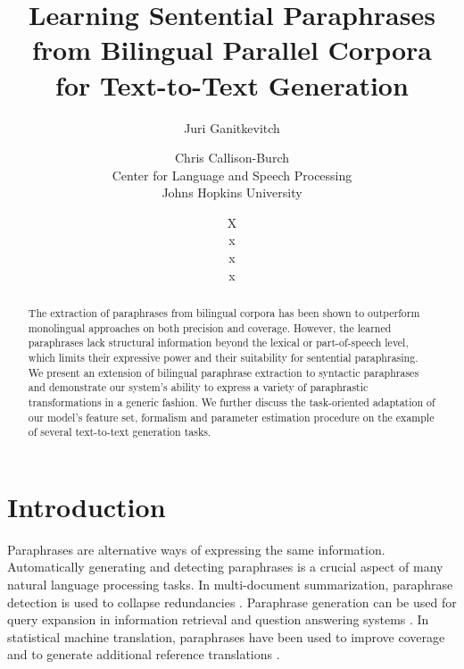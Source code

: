 \documentclass[11pt]{article}
\title{Learning Sentential Paraphrases from Bilingual Parallel Corpora \\ for Text-to-Text Generation}
\author{Juri Ganitkevitch \and Chris Callison-Burch\\ 
Center for Language and Speech Processing\\ 
Johns Hopkins University}
\author{X\\ 
x\\ 
x\\ 
x}
\date{}
\begin{document}
\maketitle

\begin{abstract}
  The extraction of paraphrases from bilingual corpora has been shown
  to outperform monolingual approaches on both precision and
  coverage. However, the learned paraphrases lack structural
  information beyond the lexical or part-of-speech level, which limits
  their expressive power and their suitability for sentential
  paraphrasing. We present an extension of bilingual paraphrase
  extraction to syntactic paraphrases and demonstrate our system's
  ability to express a variety of paraphrastic transformations in a
  generic fashion. We further discuss the task-oriented adaptation of
  our model's feature set, formalism and parameter estimation
  procedure on the example of several text-to-text generation tasks.
\end{abstract}

\section{Introduction} \label{introduction}

Paraphrases are alternative ways of expressing the same information. 
Automatically generating and detecting paraphrases is a crucial aspect of many 
natural language processing tasks.
In multi-document summarization, paraphrase detection is used
to collapse redundancies \cite{Barzilay1999}. Paraphrase generation can be used 
for query expansion in information retrieval and question
answering systems \cite{mckeown:1979:ACL,Anick1999,Ravichandran2002,Riezler2007}. 
In statistical machine translation, paraphrases have been used to improve coverage
and to generate additional reference translations
 \cite{Callison-Burch2006b,Madnani2007}.
\end{document}
